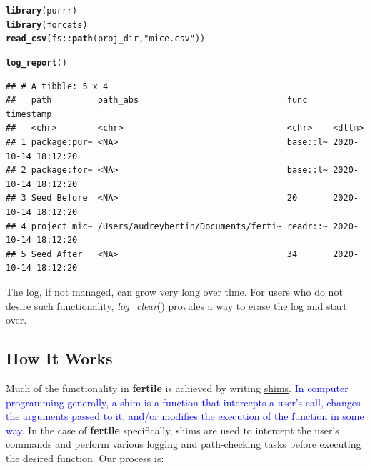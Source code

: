 \documentclass[APA,LATO1COL]{WileyNJD-v2}\usepackage[]{graphicx}\usepackage[]{color}
\makeatletter
\newcommand{\hlstr}[1]{\textcolor[rgb]{0.192,0.494,0.8}{#1}}%
\newcommand{\hlopt}[1]{\textcolor[rgb]{0,0,0}{#1}}%
\newcommand{\hlstd}[1]{\textcolor[rgb]{0.345,0.345,0.345}{#1}}%
\newcommand{\hlkwd}[1]{\textcolor[rgb]{0.737,0.353,0.396}{\textbf{#1}}}%
\newenvironment{kframe}{%
 \def\at@end@of@kframe{}%
 \ifinner\ifhmode%
  \def\at@end@of@kframe{\end{minipage}}%
  \begin{minipage}{\columnwidth}%
 \fi\fi%
 \def\FrameCommand##1{\hskip\@totalleftmargin \hskip-\fboxsep
 \colorbox{shadecolor}{##1}\hskip-\fboxsep
     \hskip-\linewidth \hskip-\@totalleftmargin \hskip\columnwidth}%
 \MakeFramed {\advance\hsize-\width
   \@totalleftmargin\z@ \linewidth\hsize
   \@setminipage}}%
 {\par\unskip\endMakeFramed%
 \at@end@of@kframe}
\newenvironment{knitrout}{}{} %
\newcommand{\pkg}[1]{\textbf{#1}}
\newcommand{\func}[1]{\textit{#1}()}
\makeatother
\begin{document}
\begin{knitrout}
\color{fgcolor}\begin{kframe}
\begin{alltt}
\hlkwd{library}\hlstd{(purrr)}
\hlkwd{library}\hlstd{(forcats)}
\hlkwd{read_csv}\hlstd{(fs}\hlopt{::}\hlkwd{path}\hlstd{(proj_dir,} \hlstr{"mice.csv"}\hlstd{))}
\end{alltt}
\end{kframe}
\end{knitrout}

\begin{knitrout}
\color{fgcolor}\begin{kframe}
\begin{alltt}
\hlkwd{log_report}\hlstd{()}
\end{alltt}
\begin{verbatim}
## # A tibble: 5 x 4
##   path         path_abs                             func     timestamp          
##   <chr>        <chr>                                <chr>    <dttm>             
## 1 package:pur~ <NA>                                 base::l~ 2020-10-14 18:12:20
## 2 package:for~ <NA>                                 base::l~ 2020-10-14 18:12:20
## 3 Seed Before  <NA>                                 20       2020-10-14 18:12:20
## 4 project_mic~ /Users/audreybertin/Documents/ferti~ readr::~ 2020-10-14 18:12:20
## 5 Seed After   <NA>                                 34       2020-10-14 18:12:20
\end{verbatim}
\end{kframe}
\end{knitrout}

The log, if not managed, can grow very long over time. For users who do not desire such functionality, \func{log\_clear} provides a way to erase the log and start over.




\subsection{How It Works}

Much of the functionality in \pkg{fertile} is achieved by writing \href{https://en.wikipedia.org/wiki/Shim_(computing)}{shims}. \textcolor{blue}{{In computer programming generally, a shim is a function that intercepts a user's call, changes the arguments passed to it, and/or modifies the execution of the function in some way.}} In the case of \pkg{fertile} specifically, shims are used to intercept the user's commands and perform various logging and path-checking tasks before executing the desired function. Our process is:
\end{document}
